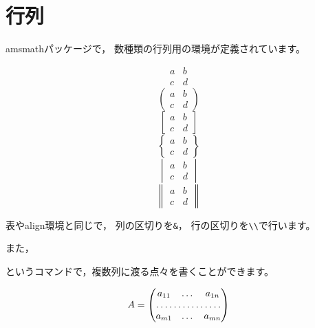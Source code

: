 \section{行列}
amsmathパッケージで，
数種類の行列用の環境が定義されています。

\begin{IOTeX}
\[
\begin{matrix}
a & b \\
c & d
\end{matrix}
\]
\[
\begin{pmatrix}
a & b \\
c & d
\end{pmatrix}
\]
\[
\begin{bmatrix}
a & b \\
c & d
\end{bmatrix}
\]
\[
\begin{Bmatrix}
a & b \\
c & d
\end{Bmatrix}
\]
\[
\begin{vmatrix}
a & b \\
c & d
\end{vmatrix}
\]
\[
\begin{Vmatrix}
a & b \\
c & d
\end{Vmatrix}
\]
\end{IOTeX}

表やalign環境と同じで，
列の区切りを\verb|&|，
行の区切りを\verb|\\|で行います。

また，
\begin{ITeX}
\end{ITeX}
というコマンドで，複数列に渡る点々を書くことができます。

\begin{IOTeX}
\[
A = 
\begin{pmatrix}
a_{11} & \dots & a_{1n}\\
\hdotsfor{3} \\
a_{m1} & \dots & a_{mn}
\end{pmatrix}
\]
\end{IOTeX}

